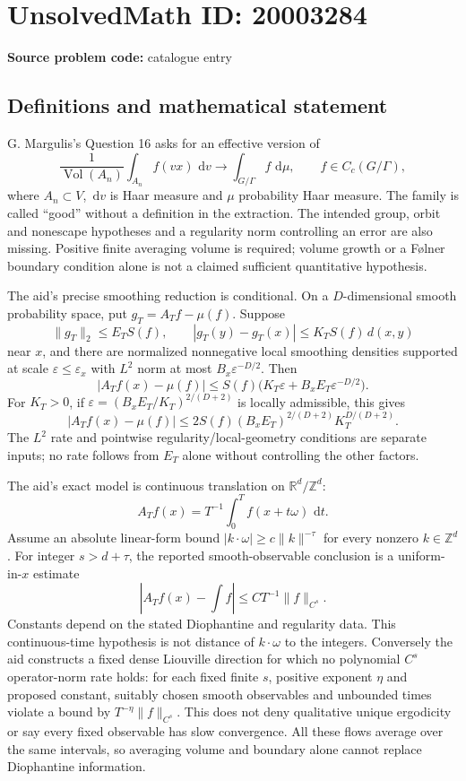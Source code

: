 \documentclass[11pt]{article}
\newcommand{\Z}{\mathbb{Z}}
\newcommand{\R}{\mathbb{R}}
\newcommand{\eps}{\varepsilon}
\newcommand{\dd}{\,\mathrm{d}}
\begin{document}
\section*{UnsolvedMath ID: 20003284}
\textbf{Source problem code:} catalogue entry
\subsection{Definitions and mathematical statement}
G. Margulis's Question 16 asks for an effective version of
\[
\frac1{\operatorname{Vol}(A_n)}\int_{A_n}f(vx)\,\dd v\longrightarrow\int_{G/\Gamma}f\,\dd\mu,
\qquad f\in C_c(G/\Gamma),
\]
where $A_n\subset V$, $\dd v$ is Haar measure and $\mu$ probability Haar measure. The family is called ``good'' without a definition in the extraction. The intended group, orbit and nonescape hypotheses and a regularity norm controlling an error are also missing. Positive finite averaging volume is required; volume growth or a F\o lner boundary condition alone is not a claimed sufficient quantitative hypothesis.

The aid's precise smoothing reduction is conditional. On a $D$-dimensional smooth probability space, put $g_T=A_Tf-\mu(f)$. Suppose
\[
\|g_T\|_2\leq E_TS(f),\qquad
|g_T(y)-g_T(x)|\leq K_TS(f)\,d(x,y)
\]
near $x$, and there are normalized nonnegative local smoothing densities supported at scale $\eps\leq\eps_x$ with $L^2$ norm at most $B_x\eps^{-D/2}$. Then
\[
|A_Tf(x)-\mu(f)|\leq S(f)\bigl(K_T\eps+B_xE_T\eps^{-D/2}\bigr).
\]
For $K_T>0$, if $\eps=(B_xE_T/K_T)^{2/(D+2)}$ is locally admissible, this gives
\[
|A_Tf(x)-\mu(f)|\leq
2S(f)(B_xE_T)^{2/(D+2)}K_T^{D/(D+2)}.
\]
The $L^2$ rate and pointwise regularity/local-geometry conditions are separate inputs; no rate follows from $E_T$ alone without controlling the other factors.

The aid's exact model is continuous translation on $\R^d/\Z^d$:
\[
A_Tf(x)=T^{-1}\int_0^T f(x+t\omega)\,\dd t.
\]
Assume an absolute linear-form bound $|k\cdot\omega|\geq c\|k\|^{-\tau}$ for every nonzero $k\in\Z^d$. For integer $s>d+\tau$, the reported smooth-observable conclusion is a uniform-in-$x$ estimate
\[
|A_Tf(x)-\textstyle\int f|\leq C T^{-1}\|f\|_{C^s}.
\]
Constants depend on the stated Diophantine and regularity data. This continuous-time hypothesis is not distance of $k\cdot\omega$ to the integers. Conversely the aid constructs a fixed dense Liouville direction for which no polynomial $C^s$ operator-norm rate holds: for each fixed finite $s$, positive exponent $\eta$ and proposed constant, suitably chosen smooth observables and unbounded times violate a bound by $T^{-\eta}\|f\|_{C^s}$. This does not deny qualitative unique ergodicity or say every fixed observable has slow convergence. All these flows average over the same intervals, so averaging volume and boundary alone cannot replace Diophantine information.
\end{document}
